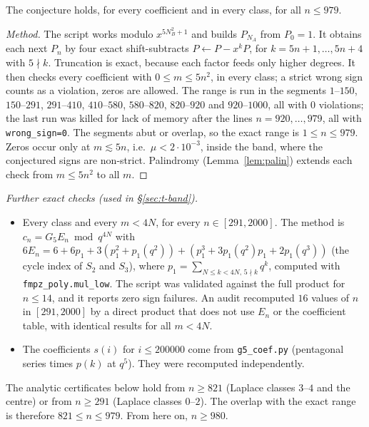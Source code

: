 \begin{theorem}[exact]\label{thm:t-exact}
The conjecture holds, for every coefficient and in every class, for all $n\le 979$.
\end{theorem}
\begin{proof}[Method]
The script works modulo $x^{5N_B^2+1}$ and builds $P_{N_A}$ from $P_0=1$. It obtains each next $P_n$ by four exact
shift-subtracts $P\leftarrow P-x^kP$, for $k=5n+1,\dots,5n+4$ with $5\nmid k$. Truncation is exact, because each factor
feeds only higher degrees. It then checks every coefficient with $0\le m\le5n^2$, in every class; a strict wrong sign
counts as a violation, zeros are allowed. The range is run in the segments $1$--$150$, $150$--$291$, $291$--$410$,
$410$--$580$, $580$--$820$, $820$--$920$ and $920$--$1000$, all with $0$ violations; the last run was killed for lack of
memory after the lines $n=920,\dots,979$, all with \texttt{wrong\_sign=0}. The segments abut or overlap, so the exact range
is $1\le n\le979$. Zeros occur only at $m\lesssim5n$, i.e.\ $\mu<2\cdot10^{-3}$, inside the band, where the conjectured
signs are non-strict. Palindromy (Lemma~\ref{lem:palin}) extends each check from $m\le5n^2$ to all $m$.
\end{proof}

\emph{Further exact checks (used in \S\ref{sec:t-band}).}
\begin{itemize}
\item Every class and every $m<4N$, for every $n\in[291,2000]$. The method is $c_n=G_5E_n\bmod q^{4N}$ with
$6E_n=6+6p_1+3(p_1^2+p_1(q^2))+(p_1^3+3p_1(q^2)p_1+2p_1(q^3))$ (the cycle index of $S_2$ and $S_3$), where
$p_1=\sum_{N\le k<4N,\,5\nmid k}q^k$, computed with \texttt{fmpz\_poly.mul\_low}. The script was validated against the full
product for $n\le14$, and it reports zero sign failures. An audit recomputed $16$ values of $n$ in $[291,2000]$ by a direct
product that does not use $E_n$ or the coefficient table, with identical results for all $m<4N$.
\item The coefficients $s(i)$ for $i\le200000$ come from \texttt{g5\_coef.py} (pentagonal series times $p(k)$ at $q^5$).
They were recomputed independently.
\end{itemize}

\begin{remark}
The analytic certificates below hold from $n\ge821$ (Laplace classes $3$--$4$ and the centre) or from $n\ge291$ (Laplace
classes $0$--$2$). The overlap with the exact range is therefore $821\le n\le979$. From here on, $n\ge980$.
\end{remark}

